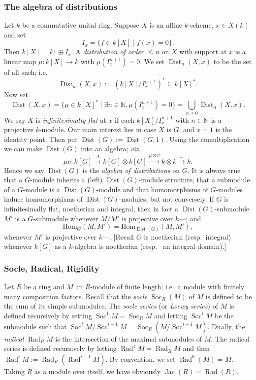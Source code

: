 \documentclass[11pt,reqno]{amsart}
\theoremstyle{definition}
\theoremstyle{remark}
\theoremstyle{definition}
\theoremstyle{plain}
\DeclareMathOperator{\Rad}{Rad}
\DeclareMathOperator{\Dist}{Dist}
\DeclareMathOperator{\Soc}{Soc}
\DeclareMathOperator{\Jac}{Jac}
\newcommand{\Hom}{\mathrm{Hom}}
\begin{document}
\subsubsection{The algebra of distributions}
Let $k$ be a commutative unital ring. Suppose $X$ is an affine $k$-scheme, $x\in X(k)$ and set $$I_x=\{f\in k[X]\mid f(x)=0\}.$$ Then $k[X]=k1\oplus I_x$. A \emph{distribution of order $\leq n$} on $X$ with support at $x$ is a linear map $\mu:k[X]\to k$ with $\mu(I_x^{n+1})=0$. We set $\Dist_n(X,x)$ to be the set of all such; i.e. \[\Dist_n(X,x):=(k[X]/I_x^{n+1})^*\subseteq k[X]^*.\] Now set \[\Dist(X,x)=\{\mu\in k[X]^*\mid \exists n\in \mathbb{N}, \mu(I_x^{n+1})=0\}=\bigcup_{n\geq 0}\Dist_n(X,x).\] 
We say $X$ is \emph{infinitesimally flat} at $x$ if each $k[X]/I_x^{n+1}$ with $n\in \mathbb{N}$ is a projective $k$-module. Our main interest lies in case $X$ is $G$, and $x=1$ is the identity point. Then put $\Dist(G):=\Dist(G,1)$. Using the comultiplication we can make $\Dist(G)$ into an algebra; \emph{viz.}
\[\mu\nu:k[G]\stackrel{\Delta}{\longrightarrow}k[G]\otimes k[G]\stackrel{\mu\otimes\nu}{\longrightarrow}k\otimes k\stackrel{\sim}{\longrightarrow} k.\]
Hence we say $\Dist(G)$ is the \emph{algebra of distributions} on $G$. It is always true that a $G$-module inherits a (left) $\Dist(G)$-module structure, that a submodule of a $G$-module is a $\Dist(G)$-module and that homomorphisms of $G$-modules induce homomorphisms of $\Dist(G)$-modules, but not conversely. If $G$ is infinitesimally flat, noetherian and integral, then in fact a $\Dist(G)$-submodule $M'$ is a $G$-submodule whenever $M/M'$ is projective over $k$---\!\!\cite[I.7.15]{Jan03}; and \begin{equation}\Hom_G(M,M')=\Hom_{\Dist(G)}(M,M'),\label{eqn:disthoms}\end{equation} whenever $M'$ is projective over $k$---\!\!\cite[I.7.16]{Jan03}. [Recall $G$ is noetherian (resp.~integral) whenever $k[G]$ as a $k$-algebra is  noetherian (resp.~ an integral domain).]



\subsubsection{Socle, Radical, Rigidity}\label{sec:soc}
Let $R$ be a ring and $M$ an $R$-module of finite length; i.e.~a module with finitely many composition factors. Recall that the \emph{socle} $\Soc_R(M)$ of $M$ is defined to be the sum of its simple submodules. The \emph{socle series} (or \emph{Loewy series}) of $M$ is defined recursively by setting $\Soc^1M = \Soc_RM$
and letting $\Soc^iM$ be the submodule such that $\Soc^iM/\Soc^{i-1}M = \Soc_R(M/\Soc^{i-1}M)$. Dually, the \emph{radical} $\Rad_RM$ is the intersection of the maximal submodules of $M$. The radical series is defined recursively by letting $\Rad^1M = \Rad_RM$ and then $\Rad^iM:=\Rad_R(\Rad^{i-1}M)$. By convention, we set $\Rad^0(M) = M$. Taking $R$ as a module over itself, we have obviously $\Jac(R)=\Rad(R)$.
\end{document}

